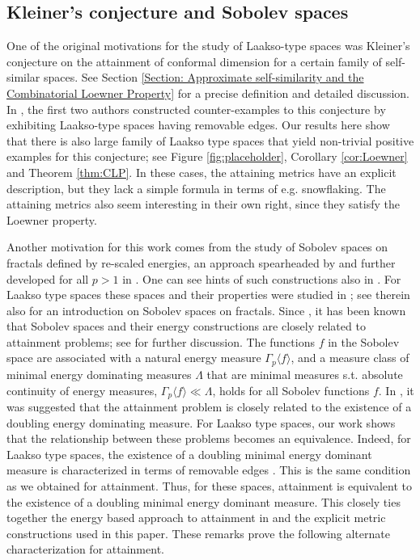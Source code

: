 \documentclass{amsart}
\numberwithin{equation}{section}
\theoremstyle{definition}
\theoremstyle{remark}
\begin{document}
\subsection{Kleiner's conjecture and Sobolev spaces}

One of the original motivations for the study of Laakso-type spaces was Kleiner's conjecture on the attainment of conformal dimension for a certain family of self-similar spaces.
See Section \ref{Section: Approximate self-similarity and the Combinatorial Loewner Property} for a precise definition and detailed discussion. In \cite{anttila2024constructions}, the first two authors constructed counter-examples to this conjecture by exhibiting Laakso-type spaces having removable edges. Our results here show that there is also large family of Laakso type spaces that yield non-trivial positive examples for this conjecture; see Figure \ref{fig:placeholder}, Corollary \ref{cor:Loewner} and Theorem \ref{thm:CLP}. In these cases, the attaining metrics have an explicit description, but they lack a simple formula in terms of e.g. snowflaking. The attaining metrics also seem interesting in their own right, since they satisfy the Loewner property.

Another motivation for this work comes from the study of Sobolev spaces on fractals defined by re-scaled energies, an approach spearheaded by \cite{KuzuokaZhou} and further developed for all $p>1$ in \cite{kigami,shimizu,murugan2023first}. One can see hints of such constructions also in \cite{P89, BS}. For Laakso type spaces these spaces and their properties were studied in \cite{ASEBShimizu}; see therein also for an introduction on Sobolev spaces on fractals. Since \cite{murugan2023first}, it has been known that Sobolev spaces and their energy constructions are closely related to attainment problems; see \cite[Remark 8.7]{ASEBShimizu} for further discussion. The functions $f$ in the Sobolev space are associated with a natural energy measure $\Gamma_p\langle f\rangle$, and a measure class of minimal energy dominating measures $\Lambda$ that are minimal measures s.t. absolute continuity of energy measures, $\Gamma_p\langle f\rangle \ll \Lambda$, holds for all Sobolev functions $f$. In \cite{murugan2023first, MN}, it was suggested that the attainment problem is closely related to the existence of a doubling energy dominating measure. For Laakso type spaces, our work shows that the relationship between these problems becomes an equivalence. Indeed, for Laakso type spaces, the existence of a doubling minimal energy dominant measure is characterized in terms of removable edges \cite[Theorem 8.4]{ASEBShimizu}. This is the same condition as we obtained for attainment. Thus, for these spaces, attainment is equivalent to the existence of a doubling minimal energy dominant measure. This closely ties together the energy based approach to attainment in \cite{murugan2023first,ASEBShimizu} and the explicit metric constructions used in this paper. These remarks prove the following alternate characterization for attainment.
\end{document}
